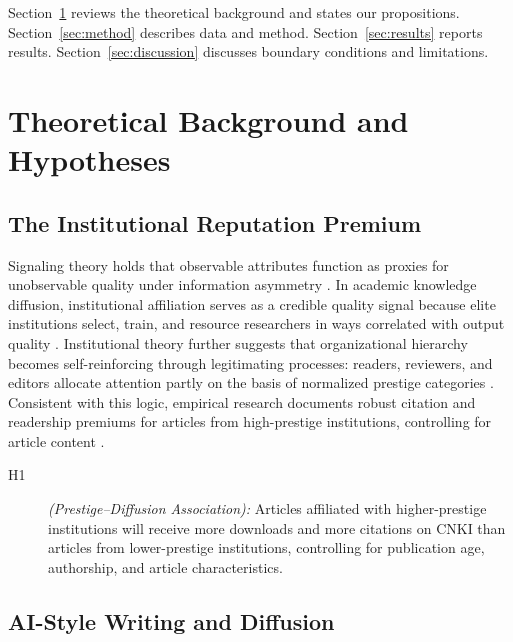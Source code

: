 \documentclass[12pt,a4paper]{article}
\begin{document}
Section~\ref{sec:theory} reviews the theoretical background and states
our propositions.
Section~\ref{sec:method} describes data and method.
Section~\ref{sec:results} reports results.
Section~\ref{sec:discussion} discusses boundary conditions and limitations.

\section{Theoretical Background and Hypotheses}
\label{sec:theory}

\subsection{The Institutional Reputation Premium}

Signaling theory holds that observable attributes function as proxies
for unobservable quality under information asymmetry \citep{Spence1973}.
In academic knowledge diffusion, institutional affiliation serves as a
credible quality signal because elite institutions select, train, and
resource researchers in ways correlated with output quality
\citep{Long1979,Lariviere2010}.
Institutional theory further suggests that organizational hierarchy
becomes self-reinforcing through legitimating processes: readers,
reviewers, and editors allocate attention partly on the basis of
normalized prestige categories \citep{DiMaggio1983}.
Consistent with this logic, empirical research documents robust
citation and readership premiums for articles from high-prestige
institutions, controlling for article content \citep{Wang2013}.
\begin{description}
  \item[H1] \textit{(Prestige--Diffusion Association):}
  Articles affiliated with higher-prestige institutions will receive
  more downloads and more citations on CNKI than articles from
  lower-prestige institutions, controlling for publication age,
  authorship, and article characteristics.
\end{description}

\subsection{AI-Style Writing and Diffusion}
\end{document}

